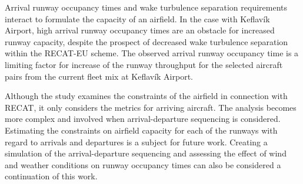 Arrival runway occupancy times and wake turbulence separation requirements interact to formulate the capacity of an airfield. In the case with Keflavík Airport, high arrival runway occupancy times are an obstacle for increased runway capacity, despite the prospect of decreased wake turbulence separation within the RECAT-EU scheme. The observed arrival runway occupancy time is a limiting factor for increase of the runway throughput for the selected aircraft pairs from the current fleet mix at Keflavík Airport.

Although the study examines the constraints of the airfield in connection with RECAT, it only considers the metrics for arriving aircraft. The analysis becomes more complex and involved when arrival-departure sequencing is considered. Estimating the constraints on airfield capacity for each of the runways with regard to arrivals and departures is a subject for future work. Creating a simulation of the arrival-departure sequencing and assessing the effect of wind and weather conditions on runway occupancy times can also be considered a continuation of this work.



